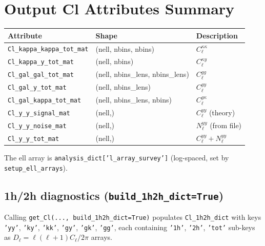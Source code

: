 \documentclass[12pt,a4paper]{article}
\newcommand{\code}[1]{\texttt{\small #1}}
\begin{document}
\section{Output Cl Attributes Summary}
\label{sec:outputs}

\begin{center}
\begin{tabular}{lll}
\toprule
Attribute & Shape & Description \\
\midrule
\code{Cl\_kappa\_kappa\_tot\_mat} & (nell, nbins, nbins) & $C_\ell^{\kappa\kappa}$ \\
\code{Cl\_kappa\_y\_tot\_mat} & (nell, nbins) & $C_\ell^{\kappa y}$ \\
\code{Cl\_gal\_gal\_tot\_mat} & (nell, nbins\_lens, nbins\_lens) & $C_\ell^{gg}$ \\
\code{Cl\_gal\_y\_tot\_mat} & (nell, nbins\_lens) & $C_\ell^{gy}$ \\
\code{Cl\_gal\_kappa\_tot\_mat} & (nell, nbins\_lens, nbins) & $C_\ell^{g\kappa}$ \\
\code{Cl\_y\_y\_signal\_mat} & (nell,) & $C_\ell^{yy}$ (theory) \\
\code{Cl\_y\_y\_noise\_mat} & (nell,) & $N_\ell^{yy}$ (from file) \\
\code{Cl\_y\_y\_tot\_mat} & (nell,) & $C_\ell^{yy}+N_\ell^{yy}$ \\
\bottomrule
\end{tabular}
\end{center}

The ell array is \code{analysis\_dict['l\_array\_survey']} (log-spaced, set by
\code{setup\_ell\_arrays}).

\subsection*{1h/2h diagnostics (\code{build\_1h2h\_dict=True})}
Calling \code{get\_Cl(..., build\_1h2h\_dict=True)} populates
\code{Cl\_1h2h\_dict} with keys \code{'yy'}, \code{'ky'}, \code{'kk'},
\code{'gy'}, \code{'gk'}, \code{'gg'}, each containing \code{'1h'}, \code{'2h'},
\code{'tot'} sub-keys as $D_\ell = \ell(\ell+1)C_\ell/2\pi$ arrays.
\end{document}
